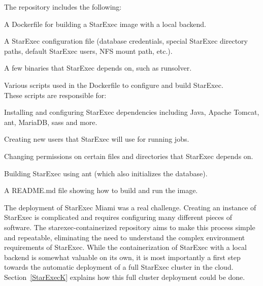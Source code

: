 \documentclass{easychair}
\newenvironment{packed_itemize}{
\vspace*{-0.3em}
\begin{itemize}
\setlength{\partopsep}{0pt}
\setlength{\itemsep}{1pt}
\setlength{\parskip}{0pt}
\setlength{\parsep}{0pt}
}{\end{itemize}}
\newcommand{\dav}[1]{{\color{red}{David: {#1}}}}
\begin{document}
The repository includes the following:
\begin{packed_itemize}
    \item A Dockerfile for building a StarExec image with a local backend.
    \item{A StarExec configuration file (database credentials, special StarExec directory paths, default StarExec users, NFS mount path, etc.).}
    \item{A few binaries that StarExec depends on, such as runsolver.}
    \item{Various scripts used in the Dockerfile to configure and build StarExec. \\
        These scripts are responsible for: 
        
        \begin{packed_itemize}
            \item{Installing and configuring StarExec dependencies including Java, Apache Tomcat, ant, MariaDB, sass and more.}
            \item{Creating new users that StarExec will use for running jobs.}
            \item{Changing permissions on certain files and directories that StarExec depends on.}
            \item{Building StarExec using ant (which also initializes the database).}
        \end{packed_itemize}
    }
    \item{A README.md file showing how to build and run the image.}
\end{packed_itemize}

The deployment of StarExec Miami was a real challenge.
Creating an instance of StarExec
is complicated and requires configuring many different pieces of software.
The starexec-containerized repository aims to make this process simple 
and repeatable, eliminating the need to understand the complex environment requirements of StarExec. 
While the containerization of StarExec with a local backend is somewhat valuable on its own,
it is most importantly a first step towards the automatic deployment of a full StarExec cluster in the cloud.
Section~\ref{StarExecK} explains how this full cluster deployment could be done.

\end{document}

